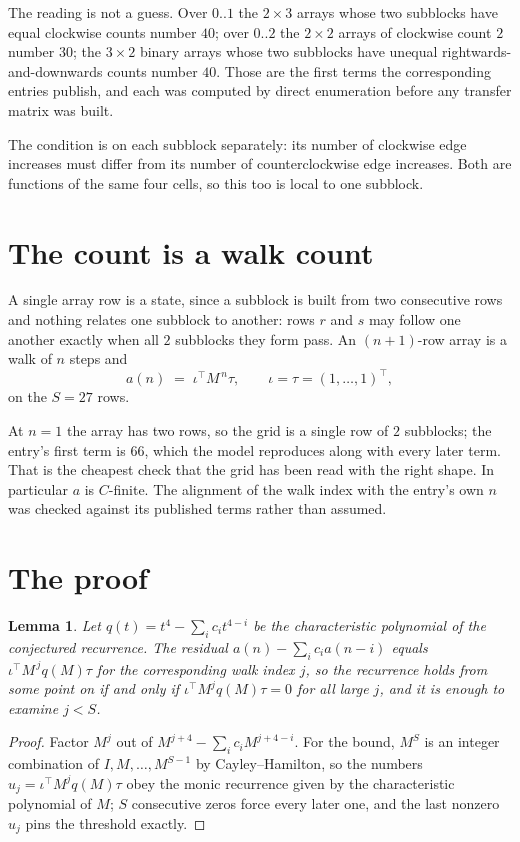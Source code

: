 \documentclass[11pt,a4paper]{article}
\theoremstyle{plain}
\newtheorem{lemma}[theorem]{Lemma}
\theoremstyle{definition}
\begin{document}
The reading is not a guess. Over $0..1$ the $2\times3$ arrays whose two subblocks have equal
clockwise counts number $40$; over $0..2$ the $2\times2$ arrays of clockwise count $2$ number
$30$; the $3\times2$ binary arrays whose two subblocks have unequal rightwards-and-downwards
counts number $40$. Those are the first terms the corresponding entries publish, and each was
computed by direct enumeration before any transfer matrix was built.

The condition is on each subblock separately: its number of clockwise edge increases must differ from its number
of counterclockwise edge increases. Both are functions of the same four cells, so this too is local to one
subblock.

\section{The count is a walk count}

A single array row is a state, since a subblock is built from two
consecutive rows and nothing relates one subblock to another: rows $r$ and $s$ may follow one
another exactly when all $2$ subblocks they form pass. An $(n+1)$-row array is a walk of $n$
steps and
\[
a(n)\;=\;\iota^{\!\top}M^{\,n}\tau,\qquad\iota=\tau=(1,\dots,1)^{\!\top},
\]
on the $S=27$ rows.

At $n=1$ the array has two rows, so the grid is a single row of $2$
subblocks; the entry's first term is $66$, which the model
reproduces along with every later term. That is the cheapest check that the grid has been read
with the right shape.
In particular $a$ is $C$-finite. The alignment of the walk index with the entry's own $n$ was
checked against its published terms rather than assumed.

\section{The proof}

\begin{lemma}\label{lem:crit}
Let $q(t)=t^{4}-\sum_i c_it^{4-i}$ be the characteristic polynomial of the
conjectured recurrence. The residual $a(n)-\sum_ic_ia(n-i)$ equals
$\iota^{\!\top}M^{\,j}q(M)\tau$ for the corresponding walk index $j$, so the recurrence
holds from some point on if and only if $\iota^{\!\top}M^{j}q(M)\tau=0$ for all large $j$,
and it is enough to examine $j<S$.
\end{lemma}

\begin{proof}
Factor $M^{j}$ out of $M^{j+4}-\sum_ic_iM^{j+4-i}$. For the bound, $M^{S}$
is an integer combination of $I,M,\dots,M^{S-1}$ by Cayley--Hamilton, so the numbers
$u_j=\iota^{\!\top}M^{j}q(M)\tau$ obey the monic recurrence given by the characteristic
polynomial of $M$; $S$ consecutive zeros force every later one, and the last nonzero $u_j$
pins the threshold exactly.
\end{proof}
\end{document}
